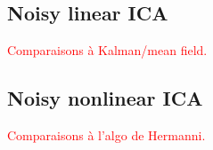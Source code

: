 \documentclass{article}
\begin{document}
\subsection{Noisy linear ICA}
\textcolor{red}{Comparaisons \`a Kalman/mean field.} 
\subsection{Noisy nonlinear ICA}
\textcolor{red}{Comparaisons \`a l'algo de Hermanni.}

\newpage

\end{document}

